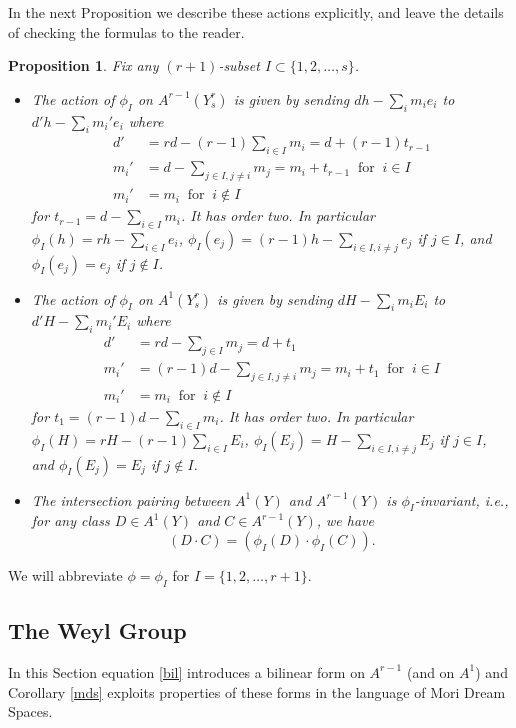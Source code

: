 \documentclass[12pt]{article}
\newtheorem{proposition}[equation]{Proposition}
\numberwithin{equation}{section}
\numberwithin{subeq}{equation}
\begin{document}
In the next Proposition we describe these actions explicitly, and leave the details of checking the formulas to the reader.

\begin{proposition}\label{CremonaAY}
Fix any $(r+1)$-subset $I \subset \{1,2,\ldots, s\}$.
\begin{itemize}
\item[(a)]
The action of $\phi_I$ on $A^{r-1}(Y^r_s)$ is given by sending $dh-\sum_i m_i e_i$ to $d'h-\sum_i m_i' e_i$ where
\begin{align*}
d' &= rd-(r-1)\sum_{i\in I} m_i =d+(r-1)t_{r-1} \\
m_i' &= d - \sum_{j\in I, j \neq i} m_j = m_i + t_{r-1} \;\;\text{for}\;\; i \in I \\
m_i' &= m_i \;\;\text{for}\;\; i \notin I
\end{align*}
for $t_{r-1} = d - \sum_{i \in I} m_i$.  It has order two.
In particular
$\phi_I(h) = rh-\sum_{i\in I} e_i$,
$\phi_I(e_j) = (r-1)h-\sum_{i\in I, i\neq j} e_j$ if $j\in I$,
and $\phi_I(e_j) = e_j$ if $j \notin I$.

\item[(b)]
The action of $\phi_I$ on $A^1(Y^r_s)$ is given by sending $dH-\sum_i m_i E_i$ to $d'H-\sum_i m_i' E_i$ where
\begin{align*}
d' &= rd - \sum_{j\in I}m_j = d+t_1 \\
m_i' &= (r-1)d - \sum_{j\in I, j\neq i} m_j = m_i + t_1 \;\;\text{for}\;\; i \in I \\
m_i' &= m_i \;\;\text{for}\;\; i \notin I
\end{align*}
for $t_1 = (r-1)d - \sum_{i \in I} m_i$.  It has order two.
In particular
$\phi_I(H) = rH-(r-1)\sum_{i\in I} E_i$,
$\phi_I(E_j) = H-\sum_{i\in I, i\neq j} E_j$ if $j\in I$,
and $\phi_I(E_j) = E_j$ if $j \notin I$.

\item[(c)]
The intersection pairing between $A^1(Y)$ and $A^{r-1}(Y)$ is $\phi_I$-invariant, i.e.,
for any class $D \in A^1(Y)$ and $C \in A^{r-1}(Y)$, we have
\[
(D \cdot C) = (\phi_I(D) \cdot \phi_I(C)).
\]
\end{itemize}
\end{proposition}

We will abbreviate $\phi = \phi_I$ for $I = \{1,2,\ldots,r+1\}$.

\subsection{The Weyl Group}\label{WeylGroupSubsection}
In this Section equation \ref{bil} introduces a bilinear form on $A^{r-1}$ (and on $A^1$) 
and Corollary \ref{mds} exploits properties of these forms in the language of Mori Dream Spaces.
\end{document}
